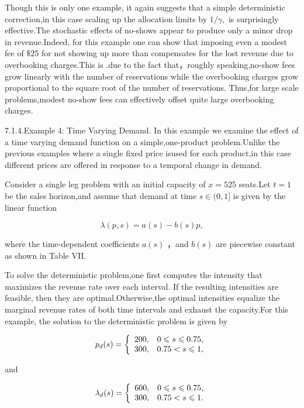 Though this is only one example, it again suggests that a simple
deterministic correction,in this case scaling up the allocation limits
by \(1 / \gamma ,\) is surprisingly effective.The stochastic effects of
no-shows appear to produce only a minor drop in revenue.Indeed, for this
example one can show that imposing even a modest fee of \(\$ 25\) for
not showing up more than compensates for the lost revenue due to
overbooking charges.This is .due to the fact that，roughly
speaking,no-show fees grow linearly with the number of reservations
while the overbooking charges grow proportional to the square root of
the number of reservations. Thus,for large scale problems,modest no-show
fees can effectively offset quite large overbooking charges.

7.1.4.Example 4: Time Varying Demand. In this example we examine the
effect of a time varying demand function on a simple,one-product
problem.Unlike the previous examples where a single fixed price isused
for each product,in this case different prices are offered in response
to a temporal change in demand.

Consider a single leg problem with an initial capacity of \(x = 5 2 5\)
seats.Let \(t = 1\) be the sales horizon,and assume that demand at time
\(s \in ( 0 , 1 ]\) is given by the linear function

\[
\lambda ( p , s ) = a ( s ) - b ( s ) p ,
\]

where the time-dependent coefficients \(a ( s )\) ，and \(b ( s )\) are
piecewise constant as shown in Table VII.

To solve the deterministic problem,one first computes the intensity that
maximizes the revenue rate over each interval. If the resulting
intensities are feasible, then they are optimal.Otherwise,the optimal
intensities equalize the marginal revenue rates of both time intervals
and exhaust the capacity.For this example, the solution to the
deterministic problem is given by

\[
p _ { d } ( s ) = \left\{ \begin{array} { c c } { 2 0 0 , } & { 0 \leqslant s \leqslant 0 . 7 5 , } \\ { 3 0 0 , } & { 0 . 7 5 < s \leqslant 1 , } \end{array} \right.
\]

and

\[
\lambda _ { d } ( s ) = \left\{ \begin{array} { l l } { 6 0 0 , } & { 0 \leqslant s \leqslant 0 . 7 5 , } \\ { 3 0 0 , } & { 0 . 7 5 < s \leqslant 1 . } \end{array} \right.
\]

